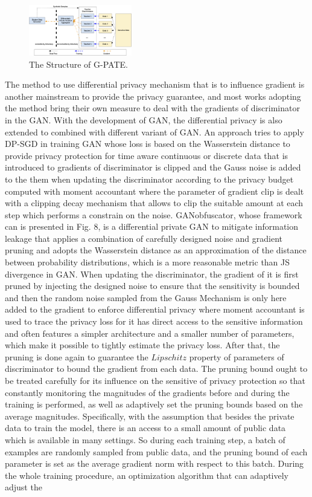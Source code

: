 \documentclass[conference]{IEEEtran}
\begin{document}
\begin{figure}[htbp]
    \centerline{\includegraphics[width=0.4\textwidth,height=0.2\textwidth]{G-PATE.png}}
    \caption{The Structure of G-PATE.}
    \label{fig7}
\end{figure}

The method to use differential privacy mechanism that is to influence gradient is another mainstream to provide the privacy guarantee, and most works adopting the method bring their own measure to deal with the gradients of discriminator in the GAN. With the development of GAN, the differential privacy is also extended to combined with different variant of GAN. An approach\cite{b36} tries to apply DP-SGD in training GAN whose loss is based on the Wasserstein distance to provide privacy protection for time aware continuous or discrete data that is introduced to gradients of discriminator is clipped and the Gauss noise is added to the them when updating the discriminator according to the privacy budget computed with moment accountant where the parameter of gradient clip is dealt with a clipping decay mechanism that allows to clip the suitable amount at each step which performs a constrain on the noise. GANobfuscator\cite{b37}, whose framework can is presented in Fig. 8, is a differential private GAN to mitigate information leakage that applies a combination of carefully designed noise and gradient pruning and adopts the Wasserstein distance as an approximation of the distance between probability distributions, which is a more reasonable metric than JS divergence in GAN. When updating the discriminator, the gradient of it is first pruned by injecting the designed noise to ensure that the sensitivity is bounded and then the random noise sampled from the Gauss Mechanism is only here added to the gradient to enforce differential privacy where moment accountant is used to trace the privacy loss for it has direct access to the sensitive information and often features a simpler architecture and a smaller number of parameters, which make it possible to tightly estimate the privacy loss. After that, the pruning is done again to guarantee the $Lipschitz$ property of parameters of discriminator to bound the gradient from each data. The pruning bound ought to be treated carefully for its influence on the sensitive of privacy protection so that constantly monitoring the magnitudes of the gradients before and during the training is performed, as well as adaptively set the pruning bounds based on the average magnitudes. Specifically, with the assumption that besides the private data to train the model, there is an access to a small amount of public data which is available in many settings. So during each training step, a batch of examples are randomly sampled from public data, and the pruning bound of each parameter is set as the average gradient norm with respect to this batch. During the whole training procedure, an optimization algorithm that can adaptively adjust the 
\end{document}
